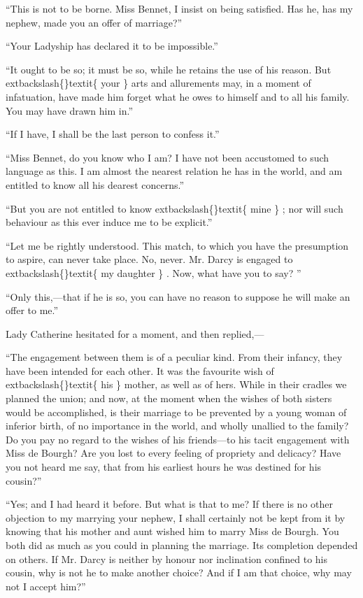 \documentclass[10pt]{book}
\begin{document}
   “This is not to be borne. Miss Bennet, I insist on being satisfied. Has
he, has my nephew, made you an offer of marriage?”
  

   “Your Ladyship has declared it to be impossible.”
  

   “It ought to be so; it must be so, while he retains the use of his
reason. But
   	extbackslash\{\}textit\{
    your
   \}
   arts and allurements may, in a moment of infatuation,
have made him forget what he owes to himself and to all his family. You
may have drawn him in.”
  

   “If I have, I shall be the last person to confess it.”
  

   “Miss Bennet, do you know who I am? I have not been accustomed to such
language as this. I am almost the nearest relation he has in the world,
and am entitled to know all his dearest concerns.”
  

   “But you are not entitled to know
   	extbackslash\{\}textit\{
    mine
   \}
   ; nor will such behaviour as
this ever induce me to be explicit.”
  

   “Let me be rightly understood. This match, to which you have the
presumption to aspire, can never take place. No, never. Mr. Darcy is
engaged to
   	extbackslash\{\}textit\{
    my daughter
   \}
   . Now, what have you to say?
   ”
  

   “Only this,—that if he is so, you can have no reason to suppose he will
make an offer to me.”
  

   Lady Catherine hesitated for a moment, and then replied,—
  

   “The engagement between them is of a peculiar kind. From their infancy,
they have been intended for each other. It was the favourite wish of
   	extbackslash\{\}textit\{
    his
   \}
   mother, as well as of hers. While in their cradles we planned the
union; and now, at the moment when the wishes of both sisters would be
accomplished, is their marriage to be prevented by a young woman of
inferior birth, of no importance in the world, and wholly unallied to
the family? Do you pay no regard to the wishes of his friends—to his
tacit engagement with Miss de Bourgh? Are you lost to every feeling of
propriety and delicacy? Have you not heard me say, that from his
earliest hours he was destined for his cousin?”
  

   “Yes; and I had heard it before. But what is that to me? If there is no
other objection to my marrying your nephew, I shall certainly not be
kept from it by knowing that his mother and aunt wished him to marry
Miss de Bourgh. You both did as much as you could in planning the
marriage. Its completion depended on others. If Mr. Darcy is neither by
honour nor inclination confined to his cousin, why is not he to make
another choice? And if I am that choice, why may not I accept him?”
  
\end{document}
